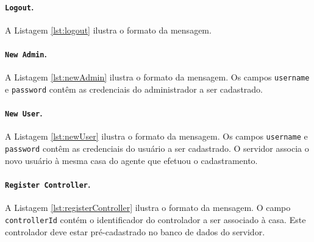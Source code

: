 \noindent
\begin{minipage}[l]{\linewidth}

\end{minipage}

\paragraph*{\texttt{Logout}.} A Listagem \ref{lst:logout} ilustra o formato da mensagem. 

\noindent
\begin{minipage}[l]{\linewidth}

\end{minipage}

\paragraph*{\texttt{New Admin}.} A Listagem \ref{lst:newAdmin} ilustra o formato da mensagem. Os campos \texttt{username} e \texttt{password} contêm as credenciais do administrador a ser cadastrado.

\noindent
\begin{minipage}[l]{\linewidth}

\end{minipage}

\paragraph*{\texttt{New User}.} A Listagem \ref{lst:newUser} ilustra o formato da mensagem. Os campos \texttt{username} e \texttt{password} contêm as credenciais do usuário a ser cadastrado. O servidor associa o novo usuário à mesma casa do agente que efetuou o cadastramento.

\noindent
\begin{minipage}[l]{\linewidth}

\end{minipage}

\paragraph*{\texttt{Register Controller}.} A Listagem \ref{lst:registerController} ilustra o formato da mensagem. O campo \texttt{controllerId} contém o identificador do controlador a ser associado à casa. Este controlador deve estar pré-cadastrado no banco de dados do servidor.

